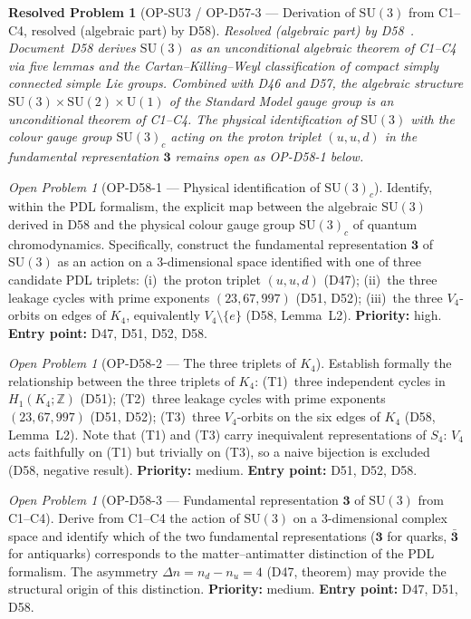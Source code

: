 \documentclass[11pt,a4paper]{article}
\newtheorem{resolvedproblem}{Resolved Problem}
\theoremstyle{plain}
\theoremstyle{definition}
\theoremstyle{remark}
\newtheorem{openproblem}[theorem]{Open Problem}
\begin{document}
\begin{resolvedproblem}[OP-SU3 / OP-D57-3 --- Derivation of $\mathrm{SU}(3)$ from C1--C4, resolved (algebraic part) by D58]
\label{op:SU3}
\textcolor{proofblue}{Resolved (algebraic part) by D58~\cite{D58}.} Document~D58 derives $\mathrm{SU}(3)$ as an unconditional algebraic theorem of C1--C4 via five lemmas and the Cartan--Killing--Weyl classification of compact simply connected simple Lie groups. Combined with D46 and D57, the algebraic structure $\mathrm{SU}(3)\times\mathrm{SU}(2)\times\mathrm{U}(1)$ of the Standard Model gauge group is an unconditional theorem of C1--C4. The physical identification of $\mathrm{SU}(3)$ with the colour gauge group $\mathrm{SU}(3)_c$ acting on the proton triplet $(u,u,d)$ in the fundamental representation $\mathbf{3}$ remains open as OP-D58-1 below.
\end{resolvedproblem}

\begin{openproblem}[OP-D58-1 --- Physical identification of $\mathrm{SU}(3)_c$]
\label{op:D58one}
Identify, within the PDL formalism, the explicit map between the algebraic $\mathrm{SU}(3)$ derived in D58 and the physical colour gauge group $\mathrm{SU}(3)_c$ of quantum chromodynamics. Specifically, construct the fundamental representation $\mathbf{3}$ of $\mathrm{SU}(3)$ as an action on a 3-dimensional space identified with one of three candidate PDL triplets: (i)~the proton triplet $(u,u,d)$ (D47); (ii)~the three leakage cycles with prime exponents $(23,67,997)$ (D51, D52); (iii)~the three $V_4$-orbits on edges of $K_4$, equivalently $V_4\setminus\{e\}$ (D58, Lemma~L2). \textbf{Priority:} high. \textbf{Entry point:} D47, D51, D52, D58.
\end{openproblem}

\begin{openproblem}[OP-D58-2 --- The three triplets of $K_4$]
\label{op:D58two}
Establish formally the relationship between the three triplets of $K_4$: (T1)~three independent cycles in $H_1(K_4;\mathbb{Z})$ (D51); (T2)~three leakage cycles with prime exponents $(23,67,997)$ (D51, D52); (T3)~three $V_4$-orbits on the six edges of $K_4$ (D58, Lemma~L2). Note that (T1) and (T3) carry inequivalent representations of $S_4$: $V_4$ acts faithfully on (T1) but trivially on (T3), so a naive bijection is excluded (D58, negative result). \textbf{Priority:} medium. \textbf{Entry point:} D51, D52, D58.
\end{openproblem}

\begin{openproblem}[OP-D58-3 --- Fundamental representation $\mathbf{3}$ of $\mathrm{SU}(3)$ from C1--C4]
\label{op:D58three}
Derive from C1--C4 the action of $\mathrm{SU}(3)$ on a 3-dimensional complex space and identify which of the two fundamental representations ($\mathbf{3}$ for quarks, $\bar{\mathbf{3}}$ for antiquarks) corresponds to the matter--antimatter distinction of the PDL formalism. The asymmetry $\Delta n = n_d - n_u = 4$ (D47, theorem) may provide the structural origin of this distinction. \textbf{Priority:} medium. \textbf{Entry point:} D47, D51, D58.
\end{openproblem}
\end{document}
